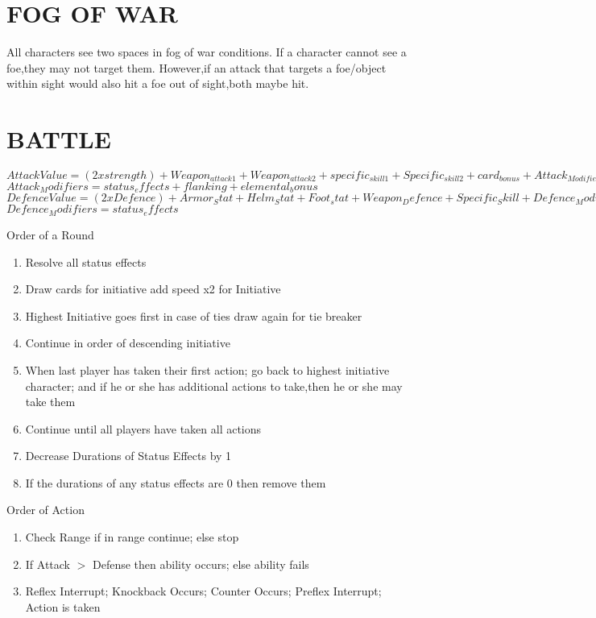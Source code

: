 \section{FOG OF WAR}
All characters see two spaces in fog of war conditions.  If a character cannot see a foe,they may not target them.  However,if an attack that targets a foe/object within sight would also hit a foe out of sight,both maybe hit.  

\section{BATTLE }
$Attack Value = (2 x strength)  + Weapon_{attack1} +Weapon_{attack2}+ specific_{skill1} + Specific_{skill2}  + card_{bonus}+ Attack_{Modifiers}$
$Attack_Modifiers = status_effects+ flanking + elemental_bonus$
$Defence Value = (2 x Defence)+ Armor_Stat+ Helm_Stat + Foot_stat+ Weapon_Defence+ Specific_Skill
+ Defence_Modifiers+5$
$Defence_Modifiers  =   status_effects$

Order of a Round
\begin{enumerate}
\item Resolve all status effects 
\item Draw cards for initiative add speed x2 for Initiative
\item Highest Initiative goes first in case of ties draw again for tie breaker
\item Continue in order of descending initiative
\item When last player has taken their first action; go back to highest initiative character; and if he or she has additional actions to take,then he or she may take them
\item Continue until all players have taken all actions
\item Decrease Durations of Status Effects by 1
\item If the durations of any status effects are 0 then remove them
\end{enumerate} 

 Order of Action
\begin{enumerate}
\item Check Range if in range continue; else stop
\item If Attack $>$ Defense then ability occurs; else ability fails
\item Reflex Interrupt; Knockback Occurs; Counter Occurs; Preflex Interrupt; Action is taken
\end{enumerate}

